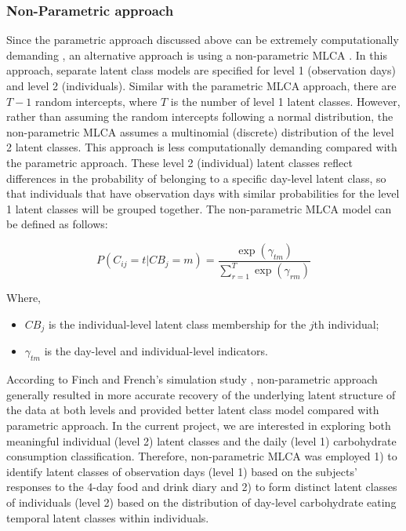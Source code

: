 \vspace{-0.5cm}
\subsubsection{Non-Parametric approach}\vspace{-0.3cm}


Since the parametric approach discussed above can be extremely computationally demanding \parencite{van2008using, vermunt2008latent}, an alternative approach is using a non-parametric MLCA \parencite{davidian2008growth}. In this approach, separate latent class models are specified for level 1 (observation days) and level 2 (individuals). Similar with the parametric MLCA approach, there are $T-1$ random intercepts, where $T$ is the number of level 1 latent classes. However, rather than assuming the random intercepts following a normal distribution, the non-parametric MLCA assumes a multinomial (discrete) distribution of the level 2 latent classes. This approach is less computationally demanding compared with the parametric approach. These level 2 (individual) latent classes reflect differences in the probability of belonging to a specific day-level latent class, so that individuals that have observation days with similar probabilities for the level 1 latent classes will be grouped together. The non-parametric MLCA model can be defined as follows: 

\begin{equation}
P(C_{ij} = t | CB_j = m)  = \frac{\exp(\gamma_{tm})}{\sum_{r=1}^{T}\exp(\gamma_{rm})}
\end{equation}

Where, 

\begin{itemize}
	\item $CB_j$ is the individual-level latent class membership for the $j$th individual;
	\item $\gamma_{tm}$ is the day-level and individual-level indicators. 
\end{itemize}

According to Finch and French's simulation study \parencite{finch2014multilevel}, non-parametric approach generally resulted in more accurate recovery of the underlying latent structure of the data at both levels and provided better latent class model compared with parametric approach. In the current project, we are interested in exploring both meaningful individual (level 2) latent classes and the daily (level 1) carbohydrate consumption classification. Therefore, non-parametric MLCA was employed 1) to identify latent classes of observation days (level 1) based on the subjects' responses to the 4-day food and drink diary and 2) to form distinct latent classes of individuals (level 2) based on the distribution of day-level carbohydrate eating temporal latent classes within individuals.\vspace{-0.3cm}
 

